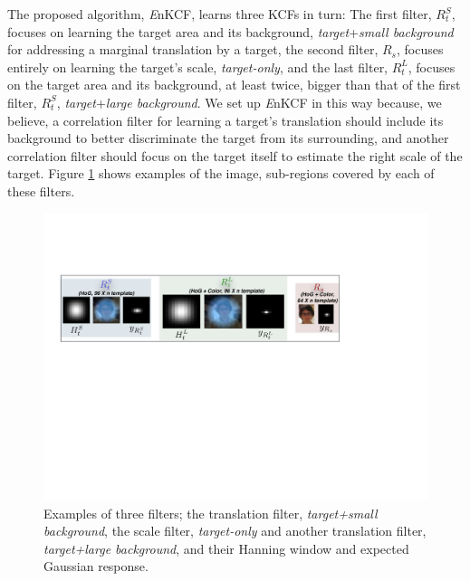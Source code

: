 \documentclass{bmvc2k}
\begin{document}
The proposed algorithm, {\it E}nKCF, learns three KCFs in turn: The
first filter, $R_{t}^{S}$, focuses on learning the target area and its
background, \textit{target}+\textit{small background} for addressing a
marginal translation by a target, the second filter, $R_{s}$, focuses
entirely on learning the target's scale, \textit{target-only}, and the
last filter, $R_{t}^{L}$, focuses on the target area and its
background, at least twice, bigger than that of the first filter,
$R_{t}^{S}$, \textit{target}+\textit{large background}. We set up {\it
  E}nKCF in this way because, we believe, a correlation filter for
learning a target's translation should include its background to
better discriminate the target from its surrounding, and another
correlation filter should focus on the target itself to estimate the
right scale of the target. Figure \ref{fig:Filters} shows examples of
the image, sub-regions covered by each of these filters.

\begin{figure}[!h]
\centering
\includegraphics[width=1.0\textwidth]{figures/Filters_Details.pdf}
\caption{Examples of three filters; the translation filter,
  \textit{target+small background}, the scale filter,
  \textit{target-only} and another translation filter,
  \textit{target+large background}, and their Hanning window and
  expected Gaussian response.}
\label{fig:Filters}
\end{figure}
\end{document}
